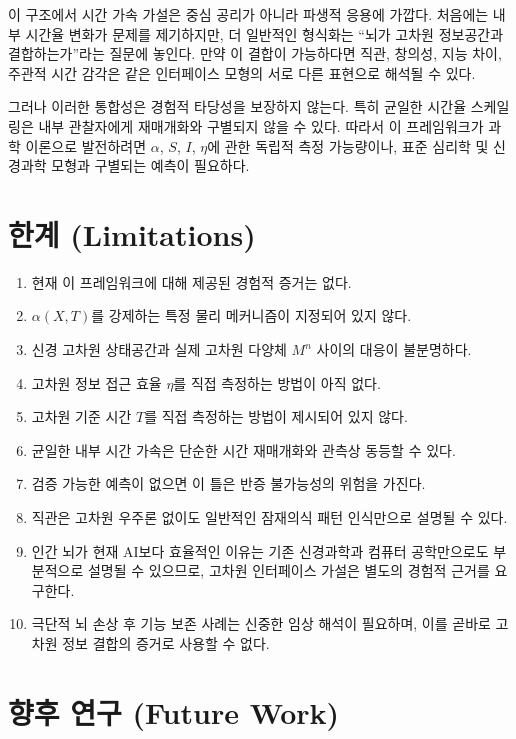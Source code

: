 \documentclass[11pt]{article}
\theoremstyle{remark}
\begin{document}
이 구조에서 시간 가속 가설은 중심 공리가 아니라 파생적 응용에 가깝다.
처음에는 내부 시간율 변화가 문제를 제기하지만, 더 일반적인 형식화는
``뇌가 고차원 정보공간과 결합하는가''라는 질문에 놓인다. 만약 이 결합이
가능하다면 직관, 창의성, 지능 차이, 주관적 시간 감각은 같은 인터페이스
모형의 서로 다른 표현으로 해석될 수 있다.

그러나 이러한 통합성은 경험적 타당성을 보장하지 않는다. 특히 균일한
시간율 스케일링은 내부 관찰자에게 재매개화와 구별되지 않을 수 있다.
따라서 이 프레임워크가 과학 이론으로 발전하려면 $\alpha$, $S$, $I$,
$\eta$에 관한 독립적 측정 가능량이나, 표준 심리학 및 신경과학 모형과
구별되는 예측이 필요하다.

\section{한계 (Limitations)}

\begin{enumerate}[leftmargin=2em]
  \item 현재 이 프레임워크에 대해 제공된 경험적 증거는 없다.
  \item $\alpha(X,T)$를 강제하는 특정 물리 메커니즘이 지정되어 있지 않다.
  \item 신경 고차원 상태공간과 실제 고차원 다양체 $M^n$ 사이의 대응이
  불분명하다.
  \item 고차원 정보 접근 효율 $\eta$를 직접 측정하는 방법이 아직 없다.
  \item 고차원 기준 시간 $T$를 직접 측정하는 방법이 제시되어 있지 않다.
  \item 균일한 내부 시간 가속은 단순한 시간 재매개화와 관측상 동등할 수
  있다.
  \item 검증 가능한 예측이 없으면 이 틀은 반증 불가능성의 위험을 가진다.
  \item 직관은 고차원 우주론 없이도 일반적인 잠재의식 패턴 인식만으로
  설명될 수 있다.
  \item 인간 뇌가 현재 AI보다 효율적인 이유는 기존 신경과학과 컴퓨터
  공학만으로도 부분적으로 설명될 수 있으므로, 고차원 인터페이스 가설은
  별도의 경험적 근거를 요구한다.
  \item 극단적 뇌 손상 후 기능 보존 사례는 신중한 임상 해석이 필요하며,
  이를 곧바로 고차원 정보 결합의 증거로 사용할 수 없다.
\end{enumerate}

\section{향후 연구 (Future Work)}
\end{document}
